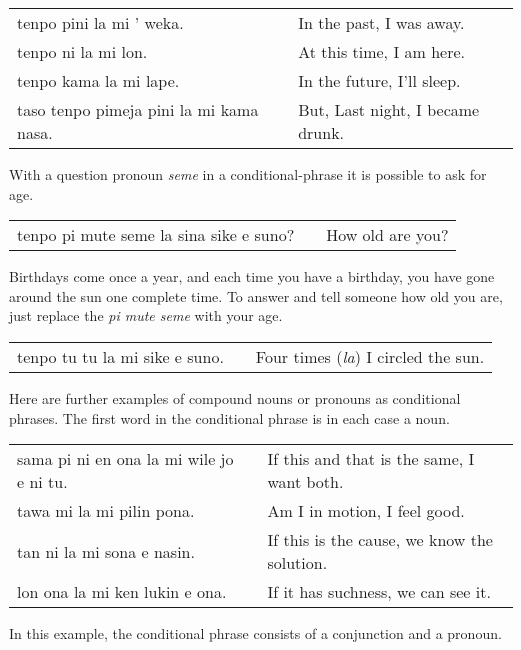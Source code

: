 \begin{supertabular}{p{5,5cm}|ll}
    tenpo pini la mi ' weka.                &  & In the past, I was away.         \\
    tenpo ni la mi lon.                     &  & At this time, I am here.         \\
    tenpo kama la mi lape.                  &  & In the future, I'll sleep.       \\
    taso tenpo pimeja pini la mi kama nasa. &  & But, Last night, I became drunk. \\
\end{supertabular}

With a question pronoun \textit{seme} in a conditional-phrase it is possible to ask for age.

\begin{supertabular}{p{5,5cm}|ll}
    tenpo pi mute seme la sina sike e suno? &  & How old are you? \\
\end{supertabular}

Birthdays come once a year, and each time you have a birthday, you have gone around the sun one complete time.
To answer and tell someone how old you are, just replace the \textit{pi mute seme} with your age.

\begin{supertabular}{p{5,5cm}|ll}
    tenpo tu tu la mi sike e suno. &  & Four times (\textit{la}) I circled the sun. \\
\end{supertabular}

Here are further examples of compound nouns or pronouns as conditional phrases.
The first word in the conditional phrase is in each case a noun.

\begin{supertabular}{p{5,5cm}|ll}
    sama pi ni en ona la mi wile jo e ni tu. &  & If this and that is the same, I want both.  \\
    tawa mi la mi pilin pona.                &  & Am I in motion, I feel good.                \\
    tan ni la mi sona e nasin.               &  & If this is the cause, we know the solution. \\
    lon ona la mi ken lukin e ona.           &  & If it has suchness, we can see it.          \\
\end{supertabular}

In this example, the conditional phrase consists of a conjunction and a pronoun.

